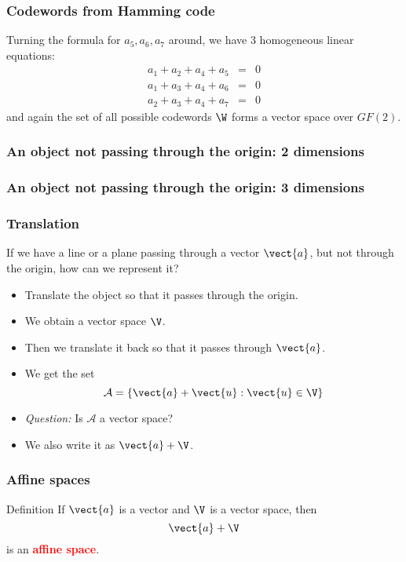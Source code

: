 \begin{frame}
  \frametitle{Codewords from Hamming code}

  Turning the formula for $a_5,a_6,a_7$ around, we have $3$
  homogeneous linear equations:
  \[
  \begin{array}{rcl}
    a_1 + a_2 + a_4 + a_5 &=& 0\\
    a_1 + a_3 + a_4 + a_6 &=& 0\\
    a_2 + a_3 + a_4 + a_7 &=& 0
  \end{array}
  \]
  and again the set of all possible codewords $\W$ forms a vector
  space over $GF(2)$.
  
\end{frame}

\begin{frame}
  \frametitle{An object not passing through the origin: 2 dimensions}
\end{frame}

\begin{frame}
  \frametitle{An object not passing through the origin: 3 dimensions}
\end{frame}

\begin{frame}
  \frametitle{Translation}

  If we have a line or a plane passing through a vector $\vect{a}$,
  but not through the origin, how can we represent it?

  \pause

  \begin{itemize}
  \item Translate the object so that it passes through the origin.
    \pause
  \item We obtain a vector space $\V$.
    \pause
  \item Then we translate it back so that it passes through $\vect{a}$.
    \pause
  \item We get the set
    \[
    {\mathcal A} = \{ \vect{a} + \vect{u} : \vect{u} \in \V \}
    \]
    \pause
  \item {\em Question:} Is $\mathcal A$ a vector space?
    \pause
  \item We also write it as $\vect{a} + \V$.
  \end{itemize}
\end{frame}

\begin{frame}
  \frametitle{Affine spaces}

  \begin{block}{Definition}
    If $\vect{a}$ is a vector and $\V$ is a vector space, then
    \[
    \vect{a} + \V
    \]
    is an \textcolor{red}{\bf affine space}.
  \end{block}
\end{frame}

